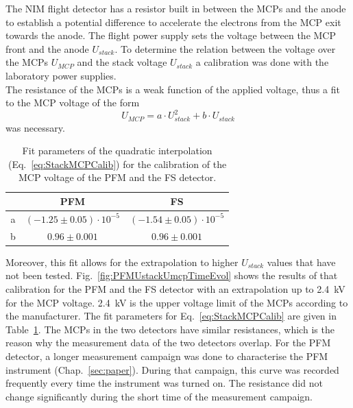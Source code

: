 	The NIM flight detector has a resistor built in between the MCPs and the anode to establish a potential difference to accelerate the electrons from the MCP exit towards the anode. The flight power supply sets the voltage between the MCP front and the anode $U_{stack}$. To determine the relation between the voltage over the MCPs $U_{MCP}$ and the stack voltage $U_{stack}$ a calibration was done with the laboratory power supplies.\\
	The resistance of the MCPs is a weak function of the applied voltage, thus a fit to the MCP voltage of the form
	\begin{equation}
		U_{MCP} = a\cdot U_{stack}^2 + b\cdot U_{stack}
		\label{eq:StackMCPCalib}
	\end{equation}
	was necessary.
	\begin{table}[h!] %
		\begin{center}
			\begin{tabular}{c|c|c|}
				& PFM	& FS\\ \hline
				a	& $(-1.25 \pm 0.05)\cdot10^{-5}$ & $(-1.54 \pm 0.05)\cdot10^{-5}$ \\
				b 	& $0.96 \pm 0.001$	& $0.96 \pm 0.001$\\
			\end{tabular}
		\end{center}
		\caption{Fit parameters of the quadratic interpolation (Eq.~\eqref{eq:StackMCPCalib}) for the calibration of the MCP voltage of the PFM and the FS detector.}
		\label{tab:UstackUmcpFitParams}
	\end{table}
	Moreover, this fit allows for the extrapolation to higher $U_{stack}$ values that have not been tested. Fig.~\ref{fig:PFMUstackUmcpTimeEvol} shows the results of that calibration for the PFM and the FS detector with an extrapolation up to 2.4~kV for the MCP voltage. 2.4~kV is the upper voltage limit of the MCPs according to the manufacturer. The fit parameters for Eq.~\eqref{eq:StackMCPCalib} are given in Table~\ref{tab:UstackUmcpFitParams}. The MCPs in the two detectors have similar resistances, which is the reason why the measurement data of the two detectors overlap. For the PFM detector, a longer measurement campaign was done to characterise the PFM instrument (Chap.~\ref{sec:paper}). During that campaign, this curve was recorded frequently every time the instrument was turned on. The resistance did not change significantly during the short time of the measurement campaign.
	
